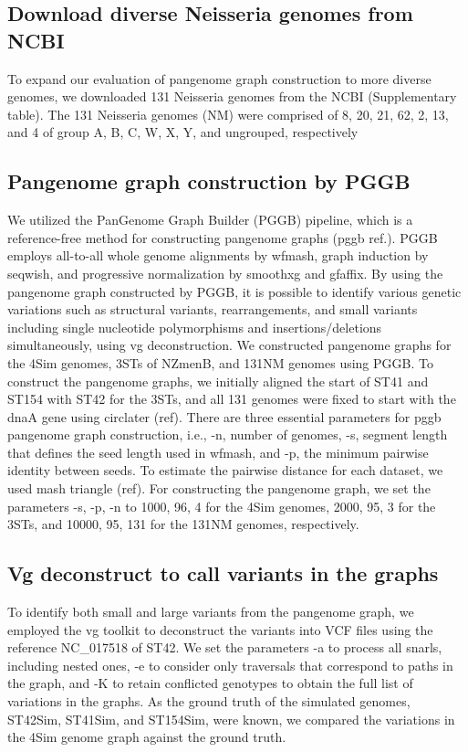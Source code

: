 \subsection{Download diverse Neisseria genomes from NCBI}
To expand our evaluation of pangenome graph construction to more diverse genomes, we downloaded 131 Neisseria genomes from the NCBI (Supplementary table). The 131 Neisseria genomes (NM) were comprised of 8, 20, 21, 62, 2, 13, and 4 of group A, B, C, W, X, Y, and ungrouped, respectively
\subsection{Pangenome graph construction by PGGB }
We utilized the PanGenome Graph Builder (PGGB) pipeline, which is a reference-free method for constructing pangenome graphs (pggb ref.). PGGB employs all-to-all whole genome alignments by wfmash, graph induction by seqwish, and progressive normalization by smoothxg and gfaffix. By using the pangenome graph constructed by PGGB, it is possible to identify various genetic variations such as structural variants, rearrangements, and small variants including single nucleotide polymorphisms and insertions/deletions simultaneously, using vg deconstruction.
We constructed pangenome graphs for the 4Sim genomes, 3STs of NZmenB, and 131NM genomes using PGGB. To construct the pangenome graphs, we initially aligned the start of ST41 and ST154 with ST42 for the 3STs, and all 131 genomes were fixed to start with the dnaA gene using circlater (ref).
There are three essential parameters for pggb pangenome graph construction, i.e., -n, number of genomes, -s, segment length that defines the seed length used in wfmash, and -p, the minimum pairwise identity between seeds. To estimate the pairwise distance for each dataset, we used mash triangle (ref). For constructing the pangenome graph, we set the parameters -s, -p, -n to 1000, 96, 4 for the 4Sim genomes, 2000, 95, 3 for the 3STs, and 10000, 95, 131 for the 131NM genomes, respectively. 
\subsection{Vg deconstruct to call variants in the graphs}
To identify both small and large variants from the pangenome graph, we employed the vg toolkit to deconstruct the variants into VCF files using the reference NC_017518 of ST42. We set the parameters -a to process all snarls, including nested ones, -e to consider only traversals that correspond to paths in the graph, and -K to retain conflicted genotypes to obtain the full list of variations in the graphs.
As the ground truth of the simulated genomes, ST42Sim, ST41Sim, and ST154Sim, were known, we compared the variations in the 4Sim genome graph against the ground truth.
